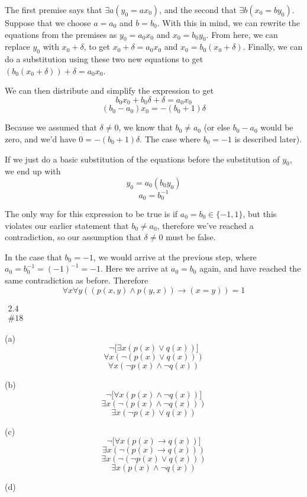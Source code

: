 \documentclass{article}
\newcommand{\T}{1}
\newcommand{\problem}[2]{$\boxed{\begin{array}{l}\text{#1} \\ \text{\##2}\end{array}}$}
\newcommand{\subproblem}[1]{(#1)}
\begin{document}
\begin{multicols*}{2}
The first premise says that $\exists{}a(y_0=ax_0)$, and the second
that $\exists{}b(x_0=by_0)$. Suppose that we choose $a=a_0$ and
$b=b_0$. With this in mind, we can rewrite the equations from the
premises as $y_0=a_0x_0$ and $x_0=b_0y_0$. From here, we can replace
$y_0$ with $x_0+\delta$, to get $x_0+\delta=a_0x_0$ and
$x_0=b_0(x_0+\delta)$. Finally, we can do a substitution using these
two new equations to get $(b_0(x_0+\delta))+\delta=a_0x_0$.

We can then distribute and simplify the expression to get
\[
b_0x_0+b_0\delta+\delta=a_0x_0
\] \[
(b_0-a_0)x_0=-(b_0+1)\delta
\]

Because we assumed that $\delta\ne{}0$, we know that $b_0\ne{}a_0$ (or
else $b_0-a_0$ would be zero, and we'd have $0=-(b_0+1)\delta$. The
case where $b_0=-1$ is described later).

If we just do a basic substitution of the equations before the
substitution of $y_0$, we end up with
\[
y_0=a_0(b_0y_0)
\] \[
a_0=b_0^{-1}
\]

The only way for this expression to be true is if $a_0=b_0\in\{-1,1\}$, but
this violates our earlier statement that $b_0\ne{}a_0$, therefore
we've reached a contradiction, so our assumption that $\delta\ne{}0$
must be false.

In the case that $b_0=-1$, we would arrive at the previous step, where
$a_0=b_0^{-1}=(-1)^{-1}=-1$. Here we arrive at $a_0=b_0$ again, and
have reached the same contradiction as before. Therefore
\[
\forall{}x\forall{}y((p(x,y)\wedge p(y,x))\rightarrow(x=y)) = \boxed{\T}
\]

\problem{2.4}{18}

\subproblem{a} \[
\neg\lbrack\exists x(p(x)\vee q(x))\rbrack
\] \[
\forall x(\neg(p(x)\vee q(x)))
\] \[
\boxed{\forall x(\neg p(x)\wedge\neg q(x))}
\]

\subproblem{b} \[
\neg\lbrack\forall x(p(x)\wedge\neg q(x))\rbrack
\] \[
\exists x(\neg(p(x)\wedge\neg q(x)))
\] \[
\boxed{\exists x(\neg p(x)\vee q(x))}
\]

\subproblem{c} \[
\neg\lbrack\forall x(p(x)\rightarrow q(x))\rbrack
\] \[
\exists x(\neg(p(x)\rightarrow q(x)))
\] \[
\exists x(\neg(\neg p(x)\vee q(x)))
\] \[
\boxed{\exists x(p(x)\wedge\neg q(x))}
\]

\subproblem{d}

\end{multicols*}
\end{document}
